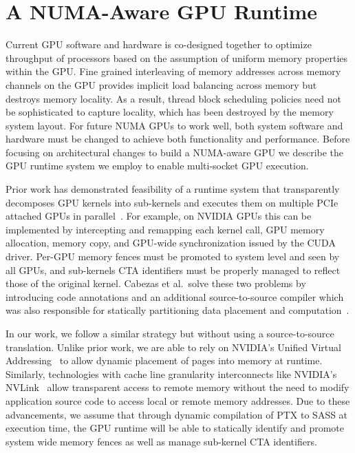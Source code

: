 \vspace{-0.1in}
\section{A NUMA-Aware GPU Runtime}

Current GPU software and hardware is co-designed together to optimize 
throughput of processors based on the assumption of uniform memory properties 
within the GPU. Fine grained interleaving of memory addresses across memory 
channels on the GPU provides implicit load balancing across memory but destroys 
memory locality.  As a result, thread block scheduling policies need not 
be sophisticated to capture locality, which has been destroyed by the 
memory system layout.  For future NUMA GPUs to work well, both system software and 
hardware must be changed to achieve both functionality and performance.  Before 
focusing on architectural changes to build a NUMA-aware GPU we describe the GPU 
runtime system we employ to enable multi-socket GPU execution.

Prior work has demonstrated feasibility of a runtime 
system that transparently decomposes GPU kernels into sub-kernels and executes 
them on multiple PCIe attached GPUs in parallel~\cite{Cabezas2015, kim2011achieving, lee2013transparent}. 
For example, on NVIDIA GPUs 
this can be implemented by intercepting and remapping each kernel call, GPU 
memory allocation, memory copy, and GPU-wide synchronization issued by the CUDA 
driver. Per-GPU memory fences must be promoted to 
system level and seen by all GPUs, and sub-kernels CTA 
identifiers must be properly managed to reflect those of the original kernel. Cabezas et al.~solve 
these two problems by introducing  code 
annotations and an additional source-to-source compiler which was also 
responsible for statically partitioning data placement and computation~\cite{Cabezas2015}.

In our work, we follow a similar strategy but without using a source-to-source
translation. Unlike prior work, we are able to rely on NVIDIA's Unified Virtual 
Addressing~\cite{UVM} to allow dynamic placement of pages into memory at
runtime. Similarly, technologies with
cache line granularity interconnects like NVIDIA's NVLink~\cite{NVLINK} allow
transparent access to remote memory without the need to modify application
source code to access local or remote memory addresses.  Due to these
advancements, we assume that through dynamic compilation of PTX to SASS at
execution time, the GPU runtime will be able to statically identify and promote 
system wide memory fences as well as manage sub-kernel CTA identifiers.

